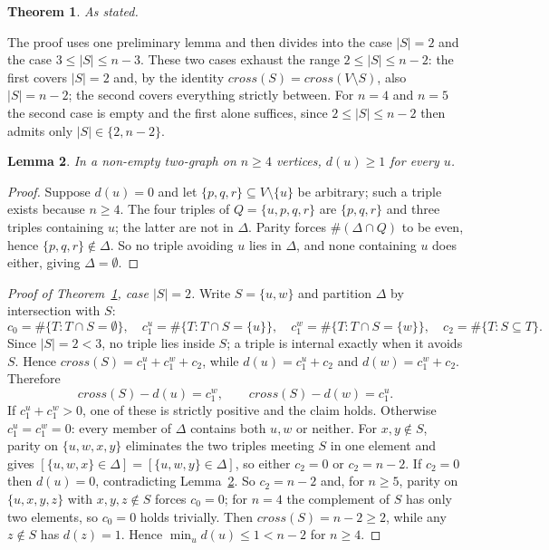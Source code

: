 \documentclass[11pt,a4paper]{article}
\def\mathrm#1{#1}%
\newtheorem{theorem}{Theorem}[section]
\newtheorem{lemma}[theorem]{Lemma}
\newcommand{\cross}{\mathrm{cross}}
\newcommand{\dtg}{d}
\begin{document}
\begin{theorem}
\label{thm:singleton}
As stated.
\end{theorem}

The proof uses one preliminary lemma and then divides into the case $|S|=2$ and the case $3\le|S|\le n-3$. These two cases exhaust the range $2\le|S|\le n-2$: the first covers $|S|=2$ and, by the identity $\cross(S)=\cross(V\setminus S)$, also $|S|=n-2$; the second covers everything strictly between. For $n=4$ and $n=5$ the second case is empty and the first alone suffices, since $2\le|S|\le n-2$ then admits only $|S|\in\{2,n-2\}$.

\begin{lemma}
\label{lem:nonzero}
In a non-empty two-graph on $n\ge4$ vertices, $\dtg(u)\ge1$ for every $u$.
\end{lemma}

\begin{proof}
Suppose $\dtg(u)=0$ and let $\{p,q,r\}\subseteq V\setminus\{u\}$ be arbitrary; such a triple exists because $n\ge4$. The four triples of $Q=\{u,p,q,r\}$ are $\{p,q,r\}$ and three triples containing $u$; the latter are not in $\Delta$. Parity forces $\#(\Delta\cap Q)$ to be even, hence $\{p,q,r\}\notin\Delta$. So no triple avoiding $u$ lies in $\Delta$, and none containing $u$ does either, giving $\Delta=\emptyset$.
\end{proof}

\begin{proof}[Proof of Theorem~\ref{thm:singleton}, case $|S|=2$]
Write $S=\{u,w\}$ and partition $\Delta$ by intersection with $S$:
\[
c_0=\#\{T:T\cap S=\emptyset\},\quad
c_1^u=\#\{T:T\cap S=\{u\}\},\quad
c_1^w=\#\{T:T\cap S=\{w\}\},\quad
c_2=\#\{T:S\subseteq T\}.
\]
Since $|S|=2<3$, no triple lies inside $S$; a triple is internal exactly when it avoids $S$. Hence $\cross(S)=c_1^u+c_1^w+c_2$, while $\dtg(u)=c_1^u+c_2$ and $\dtg(w)=c_1^w+c_2$. Therefore
\[
\cross(S)-\dtg(u)=c_1^w,\qquad \cross(S)-\dtg(w)=c_1^u .
\]
If $c_1^u+c_1^w>0$, one of these is strictly positive and the claim holds. Otherwise $c_1^u=c_1^w=0$: every member of $\Delta$ contains both $u,w$ or neither. For $x,y\notin S$, parity on $\{u,w,x,y\}$ eliminates the two triples meeting $S$ in one element and gives $[\{u,w,x\}\in\Delta]=[\{u,w,y\}\in\Delta]$, so either $c_2=0$ or $c_2=n-2$. If $c_2=0$ then $\dtg(u)=0$, contradicting Lemma~\ref{lem:nonzero}. So $c_2=n-2$ and, for $n\ge5$, parity on $\{u,x,y,z\}$ with $x,y,z\notin S$ forces $c_0=0$; for $n=4$ the complement of $S$ has only two elements, so $c_0=0$ holds trivially. Then $\cross(S)=n-2\ge2$, while any $z\notin S$ has $\dtg(z)=1$. Hence $\min_u\dtg(u)\le1<n-2$ for $n\ge4$.
\end{proof}
\end{document}
